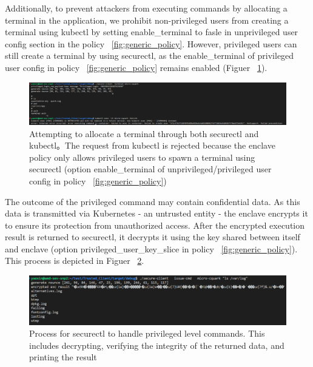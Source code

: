 Additionally, to prevent attackers from executing commands by allocating a terminal in the application, we prohibit non-privileged users from creating a terminal using kubectl by setting enable\_terminal to fasle in unprivileged user config section in the policy ~\ref{fig:generic_policy}. 
However, privileged users can still create a terminal by using securectl, as the enable\_terminal of privileged user config in policy ~\ref{fig:generic_policy} remains enabled (Figuer ~\ref{fig:cquark_terminal}).

\begin{figure}[H]
    \centering
    \includegraphics[width=1\textwidth]{images/cquark_terminal.png}
    \caption[Attempting to allocate a terminal through both securectl and kubectl]{Attempting to allocate a terminal through both securectl and kubectl。The request from kubectl is rejected because the enclave policy only allows privileged users to spawn a terminal using securectl 
    (option enable\_terminal of unprivileged/privileged user config in policy ~\ref{fig:generic_policy})}
    \label{fig:cquark_terminal}
\end{figure}

The outcome of the privileged command may contain confidential data. As this data is transmitted via Kubernetes\cite*{k8s} - an untrusted entity - the enclave encrypts it to ensure its protection from unauthorized access. After the encrypted execution result is returned to securectl, it decrypts it 
using the key shared between itself and enclave (option privileged\_user\_key\_slice in policy ~\ref{fig:generic_policy}). This process is depicted in Figuer ~\ref{fig:cquark_priviled_cmd_result_protection}.

\begin{figure}[H]
    \centering
    \includegraphics[width=1\textwidth]{images/cquark_priviled_cmd_result_protection.png}
    \caption[Process for securectl to handle privileged level commands]{Process for securectl to handle privileged level commands. This includes decrypting, verifying the integrity of the returned data, and printing the result}
    \label{fig:cquark_priviled_cmd_result_protection}
\end{figure}

